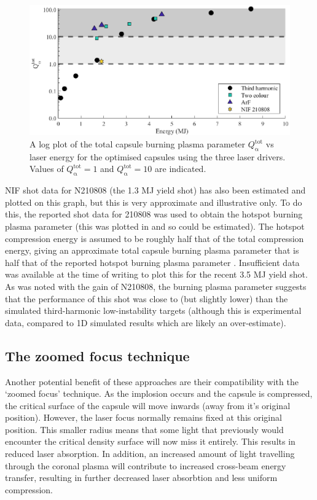 \begin{figure}[ht]
\centering
\includegraphics{figures/FurtherSims/QTwoColour.eps}
\caption{A log plot of the total capsule burning plasma parameter $Q^\mathrm{{tot}}_{\mathrm{\alpha}}$ vs laser energy for the optimised capsules using the three laser drivers. Values of $Q^\mathrm{{tot}}_{\mathrm{\alpha}} = 1$ and $Q^\mathrm{{tot}}_{\mathrm{\alpha}} = 10$ are indicated.}
\label{fig:TwoColourQ}
\end{figure}

NIF shot data for N210808 (the 1.3 MJ yield shot) has also been estimated and plotted on this graph, but this is very approximate and illustrative only. To do this, the reported shot data for 210808 \cite{Abu-Shawareb2022} was used to obtain the hotspot burning plasma parameter (this was plotted in \cite{Abu-Shawareb2022} and so could be estimated). The hotspot compression energy is assumed to be roughly half that of the total compression energy, giving an approximate total capsule burning plasma parameter that is half that of the reported hotspot burning plasma parameter \cite{Betti2015}. Insufficient data was available at the time of writing to plot this for the recent 3.5 MJ yield shot. As was noted with the gain of N210808, the burning plasma parameter suggests that the performance of this shot was close to (but slightly lower) than the simulated third-harmonic low-instability targets (although this is experimental data, compared to 1D simulated results which are likely an over-estimate).

\subsection{The zoomed focus technique}

Another potential benefit of these approaches are their compatibility with the `zoomed focus' technique. As the implosion occurs and the capsule is compressed, the critical surface of the capsule will move inwards (away from it's original position). However, the laser focus normally remains fixed at this original position. This smaller radius means that some light that previously would encounter the critical density surface will now miss it entirely. This results in reduced laser absorption. In addition, an increased amount of light travelling through the coronal plasma will contribute to increased cross-beam energy transfer, resulting in further decreased laser absorbtion and less uniform compression.

